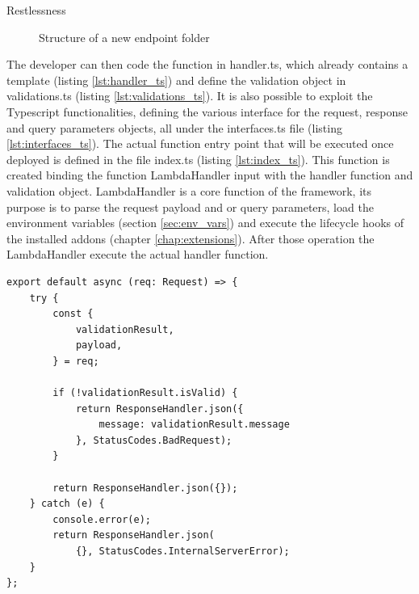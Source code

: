 \begin{chapter}{Restlessness}
    \begin{figure}
        \caption{Structure of a new endpoint folder}
        \label{fig:new_endpoint_folder_structure}
        \begin{minipage}{\linewidth}
        \end{minipage}
    \end{figure}

    The developer can then code the function in handler.ts, which already contains a
    template (listing \ref{lst:handler_ts}) and define the validation object in
    validations.ts (listing \ref{lst:validations_ts}).
    It is also possible to exploit the Typescript functionalities, defining the various
    interface for the request, response and query parameters objects, all under the
    interfaces.ts file (listing \ref{lst:interfaces_ts}).
    The actual function entry point that will be executed once deployed is defined
    in the file index.ts (listing \ref{lst:index_ts}). This function is created binding
    the function LambdaHandler input with the handler function and validation object.
    LambdaHandler is a core function of the framework, its purpose is to parse the
    request payload and or query parameters, load the environment variables (section
    \ref{sec:env_vars}) and execute the lifecycle hooks of the installed addons (chapter
    \ref{chap:extensions}).
    After those operation the LambdaHandler execute the actual handler function.

    \begin{lstlisting}[caption=handler.ts content, label={lst:handler_ts}]
export default async (req: Request) => {
    try {
        const {
            validationResult,
            payload,
        } = req;

        if (!validationResult.isValid) {
            return ResponseHandler.json({
                message: validationResult.message
            }, StatusCodes.BadRequest);
        }

        return ResponseHandler.json({});
    } catch (e) {
        console.error(e);
        return ResponseHandler.json(
            {}, StatusCodes.InternalServerError);
    }
};
    \end{lstlisting}


\end{chapter}
